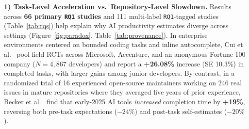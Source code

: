 \documentclass[10pt,twocolumn,a4paper]{article}
\begin{document}
\textbf{1) Task-Level Acceleration vs.\ Repository-Level Slowdown.} Results across \textbf{66 primary \texttt{RQ1} studies} and 111 multi-label \texttt{RQ1}-tagged studies (Table~\ref{tab:rqs}) help explain why AI productivity estimates diverge across settings (Figure~\ref{fig:paradox}, Table~\ref{tab:provenance}). In enterprise environments centered on bounded coding tasks and inline autocomplete, Cui et al.~\cite{cui2026effects} pool field RCTs across Microsoft, Accenture, and an anonymous Fortune 100 company ($N=4,867$ developers) and report a \textbf{+26.08\%} increase (SE 10.3\%) in completed tasks, with larger gains among junior developers. By contrast, in a randomized trial of 16 experienced open-source maintainers working on 246 real issues in mature repositories where they averaged five years of prior experience, Becker et al.~\cite{becker2025measuring} find that early-2025 AI tools \emph{increased} completion time by \textbf{+19\%}, reversing both pre-task expectations ($-24\%$) and post-task self-estimates ($-20\%$).
\end{document}
